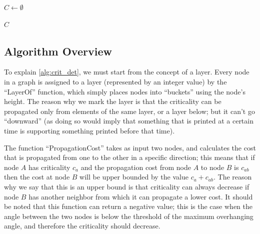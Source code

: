 \begin{algorithm}[ht]
\begin{algorithmic}[1]
    \Statex

        \State $C \gets \emptyset$

            \State {} 
        \EndFor

        \State \Return $C$
    \EndProcedure
\end{algorithmic}
\label{alg:crit_det}
\end{algorithm}


\subsection{Algorithm Overview}
To explain \cref{alg:crit_det}, we must start from the concept of a layer.
Every node in a graph is assigned to a layer (represented by an integer value)
by the ``LayerOf'' function, which simply places nodes into ``buckets'' using the node's height.
The reason why we mark the layer is that the criticality can be propagated only from
elements of the same layer, or a layer below; but it can't go ``downward'' (as doing so would imply 
that something that is printed at a certain time is supporting something printed before that time).

The function ``PropagationCost'' takes as input two nodes, and calculates the cost that 
is propagated from one to the other in a specific direction; this means that if
node $A$ has criticality $c_a$ and the propagation cost from node $A$ to node $B$ is
$c_{ab}$ then the cost at node $B$ will be upper bounded by the value $c_a + c_{ab}$.
The reason why we say that this is an upper bound is that criticality can always decrease if node $B$ has another neighbor
from which it can propagate a lower cost.
It should be noted that this function can return a negative value; this is the case when
the angle between the two nodes is below the threshold of the maximum overhanging angle, 
and therefore the criticality should decrease.

